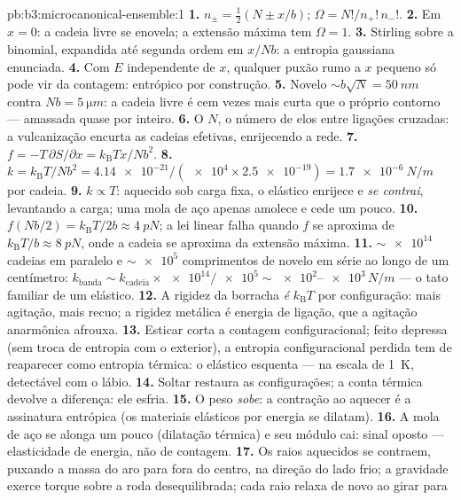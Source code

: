 \begin{solution}{pb:b3:microcanonical-ensemble:1}
\textbf{1.} $n_\pm = \tfrac12(N \pm x/b)$; $\Omega =
N!/n_+!\,n_-!$.
\textbf{2.} Em $x = 0$: a cadeia livre se enovela; a extensão máxima
tem $\Omega = 1$.
\textbf{3.} Stirling sobre a binomial, expandida até segunda ordem em
$x/Nb$: a entropia gaussiana enunciada.
\textbf{4.} Com $E$ independente de $x$, qualquer puxão rumo a $x$
pequeno só pode vir da contagem: entrópico por construção.
\textbf{5.} Novelo $\sim b\sqrt N = \qty{50}{nm}$ contra $Nb =
\qty{5}{\micro m}$: a cadeia livre é cem vezes mais curta que o
próprio contorno --- amassada quase por inteiro.
\textbf{6.} O $N$, o número de elos entre ligações cruzadas: a
vulcanização encurta as cadeias efetivas, enrijecendo a rede.
\textbf{7.} $f = -T\,\partial S/\partial x =
k_{\text{B}}Tx/Nb^2$.
\textbf{8.} $k = k_{\text{B}}T/Nb^2 = \num{4.14e-21}/(\num{e4}
\times \num{2.5e-19}) = \qty{1.7e-6}{N/m}$ por cadeia.
\textbf{9.} $k \propto T$: aquecido sob carga fixa, o elástico
enrijece e \emph{se contrai}, levantando a carga; uma mola de aço
apenas amolece e cede um pouco.
\textbf{10.} $f(Nb/2) = k_{\text{B}}T/2b \approx \qty{4}{pN}$; a lei
linear falha quando $f$ se aproxima de $k_{\text{B}}T/b \approx
\qty{8}{pN}$, onde a cadeia se aproxima da extensão máxima.
\textbf{11.} $\sim\num{e14}$ cadeias em paralelo e
$\sim\num{e5}$ comprimentos de novelo em série ao longo de um
centímetro: $k_{\text{banda}} \sim k_{\text{cadeia}} \times \num{e14}/\num{e5}
\sim \num{e2}$--$\num{e3}\,\unit{N/m}$ --- o tato familiar de um
elástico.
\textbf{12.} A rigidez da borracha \emph{é} $k_{\text{B}}T$ por
configuração: mais agitação, mais recuo; a rigidez metálica é energia
de ligação, que a agitação anarmônica afrouxa.
\textbf{13.} Esticar corta a contagem configuracional; feito depressa
(sem troca de entropia com o exterior), a entropia configuracional
perdida tem de reaparecer como entropia térmica: o elástico esquenta
--- na escala de \qty{1}{K}, detectável com o lábio.
\textbf{14.} Soltar restaura as configurações; a conta térmica devolve
a diferença: ele esfria.
\textbf{15.} O peso \emph{sobe}: a contração ao aquecer é a assinatura
entrópica (os materiais elásticos por energia se dilatam).
\textbf{16.} A mola de aço se alonga um pouco (dilatação térmica) e seu
módulo cai: sinal oposto --- elasticidade de energia, não de contagem.
\textbf{17.} Os raios aquecidos se contraem, puxando a massa do aro
para fora do centro, na direção do lado frio; a gravidade exerce torque
sobre a roda desequilibrada; cada raio relaxa de novo ao girar para

\end{solution}
